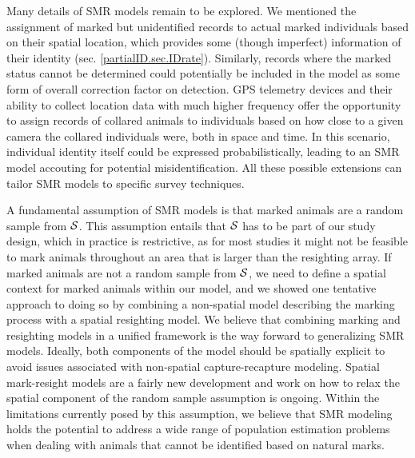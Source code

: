 Many details of SMR models remain to be explored. We mentioned the assignment of marked but unidentified records to actual marked individuals based on their spatial location, which provides some (though imperfect) information of their identity (sec. \ref{partialID.sec.IDrate}). Similarly, records where the marked status cannot be determined could potentially be included in the model as some form of overall correction factor on detection. GPS telemetry devices and their ability to collect location data with much higher frequency offer the opportunity to assign records of collared animals to individuals based on how close to a given camera the collared individuals were, both in space and time. In this scenario, individual identity itself could be expressed probabilistically, leading to an SMR model accouting for potential misidentification. All these possible extensions can tailor SMR models to specific survey techniques.

A fundamental assumption of SMR models is that marked animals are a random sample from ${\cal S}$. This assumption entails that ${\cal S}$ has to be part of our study design, which in practice is restrictive, as for most studies it might not be feasible to mark animals throughout an area that is larger than the resighting array. If marked animals are not a random sample from ${\cal S}$, we need to define a spatial context for marked animals within our model, and we showed one tentative approach to doing so by combining a non-spatial model describing the marking process with a spatial resighting model. We believe that combining marking and resighting models in a unified framework is the way forward to generalizing SMR models. Ideally, both components of the model should be spatially explicit to avoid issues associated with non-spatial capture-recapture modeling. Spatial mark-resight models are a fairly new development and work on how to relax the spatial component of the random sample assumption is ongoing. Within the limitations currently posed by this assumption, we believe that SMR modeling holds the potential to address a wide range of population estimation problems when dealing with animals that cannot be identified based on natural marks.




